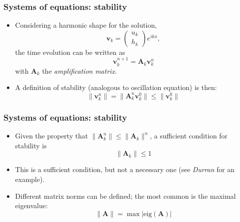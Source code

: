 \documentclass[aspectratio=149,9pt]{beamer}
\begin{document}
%
\begin{frame}
	\frametitle{Systems of equations: stability}
	\begin{itemize}
		\item Considering a harmonic shape for the solution,
			\begin{equation*}
				\bm v_k = \left(\begin{array}{c} u_k \\ h_k\end{array}\right)e^{ikx},
			\end{equation*}
			the time evolution can be written as
			\begin{equation*}
				\bm v_k^{n+1}=\bm A_k \bm v_k^n
			\end{equation*}
			with $\bm A_k$ the \emph{amplification matrix}.\vspace*{2ex}
		\item A definition of stability (analogous to oscillation equation) is then:
			\begin{equation*}
				\| {\bm v}_k^n \|  =  \| {\bm A}_k^n {\bm v}_k^0 \|  \le   \| {\bm v}_k^0 \|
			\end{equation*}
	\end{itemize}
\end{frame}
%
%
\begin{frame}
	\frametitle{Systems of equations: stability}
	\begin{itemize}
		\item Given the property that $\| {\bm A}_k^n \| \le \| {\bm A}_k \|^n$, a sufficient condition for stability is
			\begin{equation*}
				\| {\bm A}_k \| \le 1
			\end{equation*}\vspace*{2ex}
		\item This is a sufficient condition, but not a necessary one (see \emph{Durran} for an example).\vspace*{2ex}
		\item Different matrix norms can be defined; the most common is the maximal eigenvalue:
			\begin{equation*}
				\|\bm A\| = \max \left| \text{eig} (\bm A) \right|
			\end{equation*}
	\end{itemize}
\end{frame}
%
\end{document}
